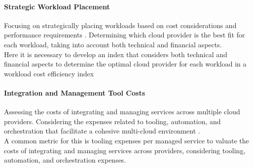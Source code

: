 
\paragraph{Strategic Workload Placement}
Focusing on strategically placing workloads based on cost considerations 
and performance requirements \cite{OptimizingCloudServicePerformance}. 
Determining which cloud provider is the best fit for each workload, 
taking into account both technical and financial aspects.\\
Here it is necessary to develop an index that considers both technical and financial aspects to 
determine the optimal cloud provider for each workload in a workload cost efficiency index



\paragraph{Integration and Management Tool Costs}
Assessing the costs of integrating and managing services across multiple cloud providers. 
Considering the expenses related to tooling, automation, and orchestration that 
facilitate a cohesive multi-cloud environment \cite{alparManagementMulticloudComputing2017}.\\
A common metric for this is tooling expenses per managed service
to valuate the costs of integrating and managing services across providers, 
considering tooling, automation, and orchestration expenses.










